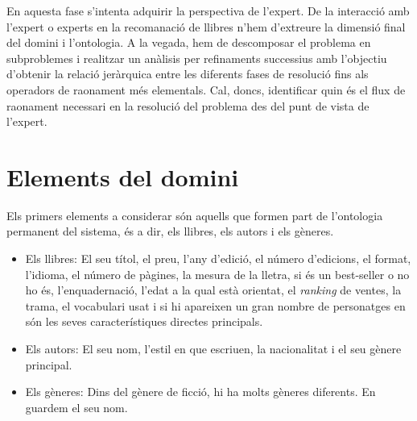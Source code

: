 
En aquesta fase s'intenta adquirir la perspectiva de l'expert. De la interacció amb l'expert o experts en la recomanació de llibres n'hem d'extreure la dimensió final del domini i l'ontologia. A  la vegada, hem de descomposar el problema en subproblemes i realitzar un anàlisis per refinaments successius amb l'objectiu d'obtenir la relació jeràrquica entre les diferents fases de resolució fins als operadors de raonament més elementals. Cal, doncs, identificar quin és el flux de raonament necessari en la resolució del problema des del punt de vista de l'expert.

\section{Elements del domini}

Els primers elements a considerar són aquells que formen part de l'ontologia permanent del sistema, és a dir, els llibres, els autors i els gèneres.
\begin{itemize}
  \item Els llibres: El seu títol, el preu, l'any d'edició, el número d'edicions, el format, l'idioma, el número de pàgines, la mesura de la lletra, si és un best-seller o no ho és, l'enquadernació, l'edat a la qual està orientat, el \emph{ranking} de ventes, la trama, el vocabulari usat i si hi apareixen un gran nombre de personatges en són les seves característiques directes principals.
  \item Els autors: El seu nom, l'estil en que escriuen, la nacionalitat i el seu gènere principal.
  \item Els gèneres: Dins del gènere de ficció, hi ha molts gèneres diferents. En guardem el seu nom.
\end{itemize}

